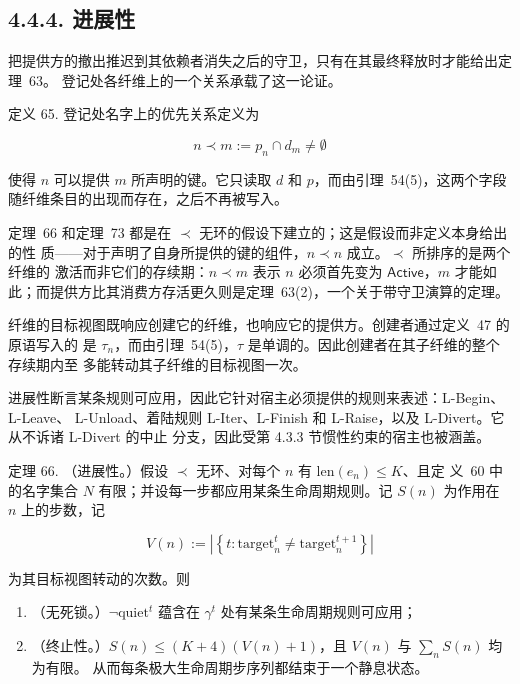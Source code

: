 \subsection{4.4.4. 进展性}\label{progress}

把提供方的撤出推迟到其依赖者消失之后的守卫，只有在其最终释放时才能给出定理~63。
登记处各纤维上的一个关系承载了这一论证。

定义 65. 登记处名字上的优先关系定义为

\[
n \prec m := p_{n} \cap d_{m} \neq \emptyset \tag{60}
\]

使得 \(n\) 可以提供 \(m\) 所声明的键。它只读取 \(d\) 和 \(p\)，而由引理~54(5)，这两个字段
随纤维条目的出现而存在，之后不再被写入。

定理~66 和定理~73 都是在 \(\prec\) 无环的假设下建立的；这是假设而非定义本身给出的性
质——对于声明了自身所提供的键的组件，\(n \prec n\) 成立。\(\prec\) 所排序的是两个纤维的
激活而非它们的存续期：\(n \prec m\) 表示 \(n\) 必须首先变为 \(\mathsf{Active}\)，\(m\) 才能如
此；而提供方比其消费方存活更久则是定理~63(2)，一个关于带守卫演算的定理。

纤维的目标视图既响应创建它的纤维，也响应它的提供方。创建者通过定义~47 的原语写入的
是 \(\tau_{n}\)，而由引理~54(5)，\(\tau\) 是单调的。因此创建者在其子纤维的整个存续期内至
多能转动其子纤维的目标视图一次。

进展性断言某条规则可应用，因此它针对宿主必须提供的规则来表述：L-Begin、L-Leave、
L-Unload、着陆规则 L-Iter、L-Finish 和 L-Raise，以及 L-Divert。它从不诉诸 L-Divert 的中止
分支，因此受第 4.3.3 节惯性约束的宿主也被涵盖。

定理 66. （进展性。）假设 \(\prec\) 无环、对每个 \(n\) 有 \(\mathrm{len}(e_{n}) \leq K\)、且定
义~60 中的名字集合 \(N\) 有限；并设每一步都应用某条生命周期规则。记 \(S(n)\) 为作用在
\(n\) 上的步数，记

\[
V(n) := \left| \left\{ t : \mathrm{target}_{n}^{t} \neq \mathrm{target}_{n}^{t+1} \right\} \right| \tag{61}
\]

为其目标视图转动的次数。则

\begin{enumerate}
\def\labelenumi{\arabic{enumi}.}
\item
  （无死锁。）\(\neg \mathrm{quiet}^{t}\) 蕴含在 \(\gamma^{t}\) 处有某条生命周期规则可应用；
\item
  （终止性。）\(S(n) \leq (K+4)(V(n)+1)\)，且 \(V(n)\) 与 \(\sum_{n} S(n)\) 均为有限。
  从而每条极大生命周期步序列都结束于一个静息状态。
\end{enumerate}


